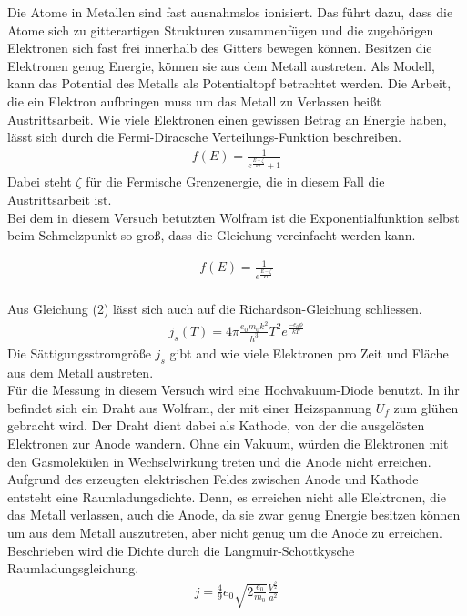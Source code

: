 Die Atome in Metallen sind fast ausnahmslos ionisiert. Das führt dazu, dass die Atome sich zu gitterartigen Strukturen zusammenfügen und die zugehörigen Elektronen sich fast frei innerhalb des Gitters bewegen können. Besitzen die Elektronen genug Energie, können sie aus dem Metall austreten. Als Modell, kann das Potential des Metalls als Potentialtopf betrachtet werden. Die Arbeit, die ein Elektron aufbringen muss um das Metall zu Verlassen heißt Austrittsarbeit.
Wie viele Elektronen einen gewissen Betrag an Energie haben, lässt sich durch die Fermi-Diracsche Verteilungs-Funktion beschreiben.
\begin{align}
f(E)=\frac{1}{e^\frac{E-\zeta}{kT}+1}
\end{align}
Dabei steht $\zeta$ für die Fermische Grenzenergie, die in diesem Fall die Austrittsarbeit ist.
\\ 
Bei dem in diesem Versuch betutzten Wolfram ist die Exponentialfunktion selbst beim Schmelzpunkt so groß, dass die Gleichung vereinfacht werden kann.
 
\begin{align}
f(E)=\frac{1}{e^\frac{E-\zeta}{kT}}
\end{align}
\\
Aus Gleichung (2) lässt sich auch auf die Richardson-Gleichung schliessen.
\begin{align}
j_s(T)=4\pi\frac{e_0 m_0 k^2}{h^3}T^2e^\frac{-e_0\phi}{kT}
\end{align}
Die Sättigungsstromgröße $j_s$ gibt and wie viele Elektronen pro Zeit und Fläche aus dem Metall austreten.
\\
Für die Messung in diesem Versuch wird eine Hochvakuum-Diode benutzt. In ihr befindet sich ein Draht aus Wolfram, der mit einer Heizspannung $U_f$ zum glühen gebracht wird. Der Draht dient dabei als Kathode, von der die ausgelösten Elektronen zur Anode wandern. Ohne ein Vakuum, würden die Elektronen mit den Gasmolekülen in Wechselwirkung treten und die Anode nicht erreichen.
\\
Aufgrund des erzeugten elektrischen Feldes zwischen Anode und Kathode entsteht eine Raumladungsdichte. Denn, es erreichen nicht alle Elektronen, die das Metall verlassen, auch die Anode, da sie zwar genug Energie besitzen können um aus dem Metall auszutreten, aber nicht genug um die Anode zu erreichen.
Beschrieben wird die Dichte durch die Langmuir-Schottkysche Raumladungsgleichung.
\begin{align}
j=\frac49e_0\sqrt{2\frac{e_0}{m_0}}\frac{V^\frac32}{a^2}
\end{align}

